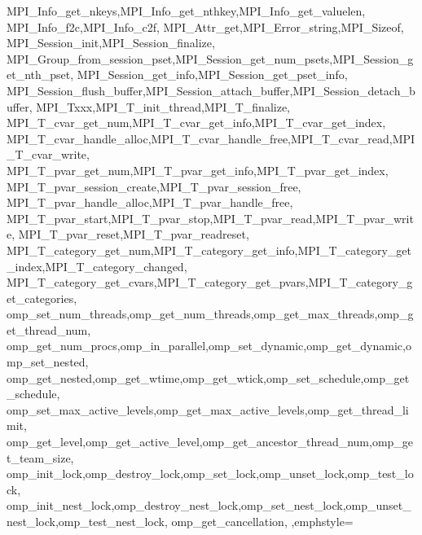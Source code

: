 {{{{{    MPI_Info_get_nkeys,MPI_Info_get_nthkey,MPI_Info_get_valuelen,
    MPI_Info_f2c,MPI_Info_c2f,
    MPI_Attr_get,MPI_Error_string,MPI_Sizeof,
    MPI_Session_init,MPI_Session_finalize,
    MPI_Group_from_session_pset,MPI_Session_get_num_psets,MPI_Session_get_nth_pset,
    MPI_Session_get_info,MPI_Session_get_pset_info,
    MPI_Session_flush_buffer,MPI_Session_attach_buffer,MPI_Session_detach_buffer,
    MPI_Txxx,MPI_T_init_thread,MPI_T_finalize,
    MPI_T_cvar_get_num,MPI_T_cvar_get_info,MPI_T_cvar_get_index,
    MPI_T_cvar_handle_alloc,MPI_T_cvar_handle_free,MPI_T_cvar_read,MPI_T_cvar_write,
    MPI_T_pvar_get_num,MPI_T_pvar_get_info,MPI_T_pvar_get_index,
    MPI_T_pvar_session_create,MPI_T_pvar_session_free,
    MPI_T_pvar_handle_alloc,MPI_T_pvar_handle_free,
    MPI_T_pvar_start,MPI_T_pvar_stop,MPI_T_pvar_read,MPI_T_pvar_write,
    MPI_T_pvar_reset,MPI_T_pvar_readreset,
    MPI_T_category_get_num,MPI_T_category_get_info,MPI_T_category_get_index,MPI_T_category_changed,
    MPI_T_category_get_cvars,MPI_T_category_get_pvars,MPI_T_category_get_categories,
    omp_set_num_threads,omp_get_num_threads,omp_get_max_threads,omp_get_thread_num,
    omp_get_num_procs,omp_in_parallel,omp_set_dynamic,omp_get_dynamic,omp_set_nested,
    omp_get_nested,omp_get_wtime,omp_get_wtick,omp_set_schedule,omp_get_schedule,
    omp_set_max_active_levels,omp_get_max_active_levels,omp_get_thread_limit,
    omp_get_level,omp_get_active_level,omp_get_ancestor_thread_num,omp_get_team_size,
    omp_init_lock,omp_destroy_lock,omp_set_lock,omp_unset_lock,omp_test_lock,
    omp_init_nest_lock,omp_destroy_nest_lock,omp_set_nest_lock,omp_unset_nest_lock,omp_test_nest_lock,
    omp_get_cancellation,
  },emphstyle={\color{red!70!black}\bfseries}
}
}}}

